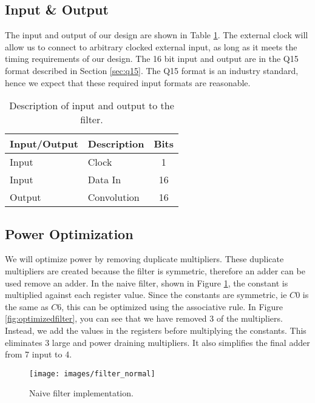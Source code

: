 \subsection{Input \& Output}
The input and output of our design are shown in Table \ref{table:inputoutput}.  The external clock will allow us to connect to arbitrary clocked external input, as long as it meets the timing requirements of our design.  The 16 bit input and output are in the Q15 format described in Section \ref{sec:q15}.  The Q15 format is an industry standard, hence we expect that these required input formats are reasonable.

\begin{table}[ht]
\centering
\begin{tabular}{l | l | c}
\hline
Input/Output & Description & Bits \\
\hline \hline
Input & Clock & 1 \\
Input & Data In & 16 \\
Output & Convolution & 16 \\
\end{tabular}
\caption{Description of input and output to the filter.}
\label{table:inputoutput}
\end{table}



\subsection{Power Optimization}

We will optimize power by removing duplicate multipliers.  These duplicate multipliers are created because the filter is symmetric, therefore an adder can be used remove an adder.  In the naive filter, shown in Figure \ref{fig:naivefilter}, the constant is multiplied against each register value.  Since the constants are symmetric, ie $C0$ is the same as $C6$, this can be optimized using the associative rule.  In Figure \ref{fig:optimizedfilter}, you can see that we have removed 3 of the multipliers.  Instead, we add the values in the registers before multiplying the constants.  This eliminates 3 large and power draining multipliers.  It also simplifies the final adder from 7 input to 4.


\begin{figure}[ht]
\centering
\texttt{[image: images/filter\_normal]}
\caption{Naive filter implementation.}
\label{fig:naivefilter}
\end{figure}


